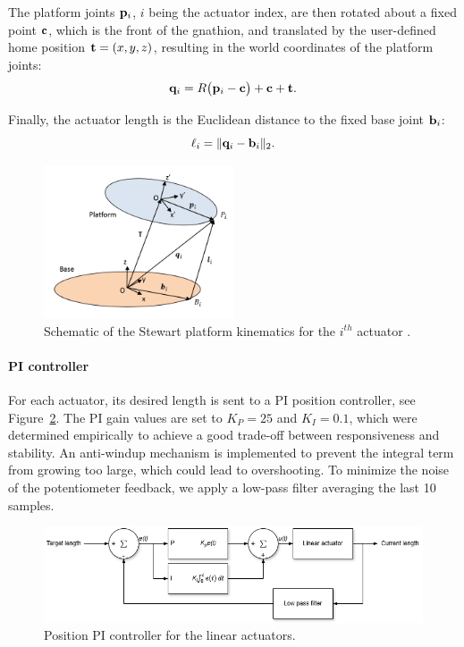 The platform joints ${\bf p}_i$, $i$ being the actuator index, are then rotated about a fixed point ${\bf c}$, 
which is the front of the gnathion, and translated by the user-defined home position ${\bf t}=(x,y,z)$, 
resulting in the world coordinates of the platform joints:
\[
{\bf q}_i = R\bigl({\bf p}_i-{\bf c}\bigr)+{\bf c}+{\bf t}.
\]

Finally, the actuator length is the Euclidean distance to the fixed base joint ${\bf b}_i$:
\[
\ell_i = \lVert {\bf q}_i-{\bf b}_i\rVert_2.
\]

\begin{figure}[H]
\centering
\includegraphics[width=0.5\textwidth]{figures/kinematic_schematic.png}
\caption{Schematic of the Stewart platform kinematics for the $i^{th}$ actuator \cite{instructables2024}.}
\label{fig:kinematic_schematic}
\end{figure}

\paragraph{PI controller}
For each actuator, its desired length is sent to a PI position controller, see Figure~\ref{fig:actuator_pi}. The PI gain values 
are set to $K_P=25$ and $K_I=0.1$, which were determined empirically to achieve a good trade-off between responsiveness and stability. 
An anti-windup mechanism is implemented to prevent the integral term from growing too large, which could lead to overshooting. 
To minimize the noise of the potentiometer feedback, we apply a low-pass filter averaging the last 10 samples.
\begin{figure}[H]
\centering
\includegraphics[width=\textwidth]{figures/actuator_pi.drawio.png}
\caption{Position PI controller for the linear actuators.}
\label{fig:actuator_pi}
\end{figure}

